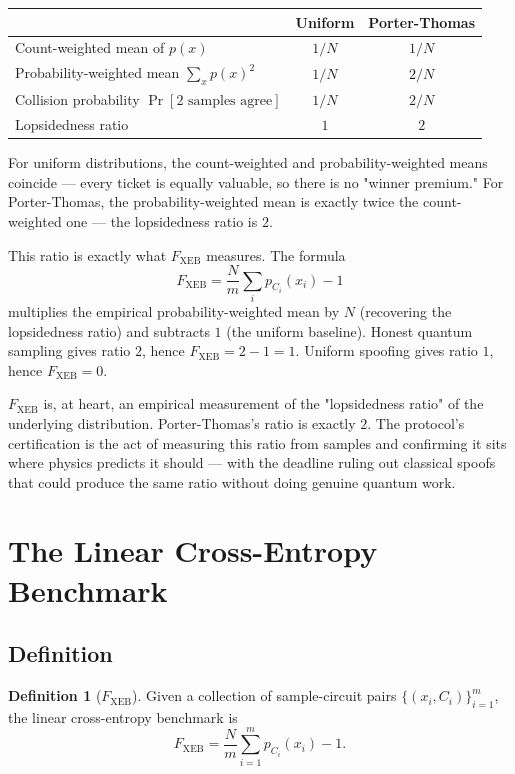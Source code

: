 \documentclass[11pt]{article}
\theoremstyle{plain}
\theoremstyle{definition}
\newtheorem{definition}[theorem]{Definition}
\newcommand{\Fxeb}{F_{\text{XEB}}}
\begin{document}
\begin{center}
\renewcommand{\arraystretch}{1.4}
\begin{tabular}{p{5.5cm}cc}
\hline
 & \textbf{Uniform} & \textbf{Porter-Thomas} \\
\hline
Count-weighted mean of $p(x)$ & $1/N$ & $1/N$ \\
Probability-weighted mean $\sum_x p(x)^2$ & $1/N$ & $2/N$ \\
Collision probability $\Pr[\text{2 samples agree}]$ & $1/N$ & $2/N$ \\
Lopsidedness ratio & $1$ & $2$ \\
\hline
\end{tabular}
\end{center}

For uniform distributions, the count-weighted and probability-weighted means coincide --- every ticket is equally valuable, so there is no "winner premium." For Porter-Thomas, the probability-weighted mean is exactly twice the count-weighted one --- the lopsidedness ratio is $2$.

This ratio is exactly what $\Fxeb$ measures. The formula
\[
\Fxeb = \frac{N}{m}\sum_i p_{C_i}(x_i) - 1
\]
multiplies the empirical probability-weighted mean by $N$ (recovering the lopsidedness ratio) and subtracts $1$ (the uniform baseline). Honest quantum sampling gives ratio $2$, hence $\Fxeb = 2 - 1 = 1$. Uniform spoofing gives ratio $1$, hence $\Fxeb = 0$.

\begin{intuition}
$\Fxeb$ is, at heart, an empirical measurement of the "lopsidedness ratio" of the underlying distribution. Porter-Thomas's ratio is exactly $2$. The protocol's certification is the act of measuring this ratio from samples and confirming it sits where physics predicts it should --- with the deadline ruling out classical spoofs that could produce the same ratio without doing genuine quantum work.
\end{intuition}

\section{The Linear Cross-Entropy Benchmark}

\subsection{Definition}

\begin{definition}[$\Fxeb$]
Given a collection of sample-circuit pairs $\{(x_i, C_i)\}_{i=1}^{m}$, the linear cross-entropy benchmark is
\begin{equation}
\Fxeb = \frac{N}{m} \sum_{i=1}^{m} p_{C_i}(x_i) - 1.
\label{eq:fxeb}
\end{equation}
\end{definition}
\end{document}
